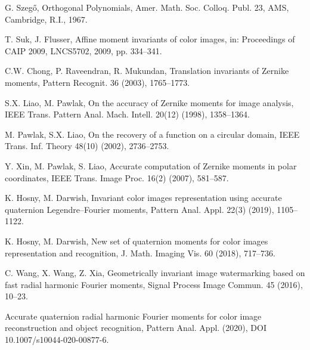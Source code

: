 \documentclass[12pt]{article}
\begin{document}
\begin{thebibliography}{99}
G. Szeg\H o, Orthogonal Polynomials, Amer. Math. Soc. Colloq. Publ. 23, AMS, Cambridge, R.I., 1967.

T. Suk, J. Flusser, Affine moment invariants of color images, in: Proceedings of CAIP 2009, LNCS5702, 2009, pp. 334--341.

C.W. Chong, P. Raveendran, R. Mukundan, Translation invariants of Zernike moments, Pattern Recognit. 36 (2003), 1765--1773.

S.X. Liao, M. Pawlak, On the accuracy of Zernike moments for image analysis, IEEE Trans. Pattern Anal. Mach. Intell. 20(12) (1998), 1358--1364.

M. Pawlak, S.X. Liao, On the recovery of a function on a circular domain, IEEE Trans. Inf. Theory 48(10) (2002), 2736–2753.

Y. Xin, M. Pawlak, S. Liao, Accurate computation of Zernike moments in polar coordinates, IEEE Trans. Image Proc. 16(2) (2007), 581--587.

K. Hosny, M. Darwish, 
Invariant color images representation using accurate quaternion Legendre--Fourier moments, 
Pattern Anal. Appl. 22(3) (2019), 1105--1122.

K. Hosny, M. Darwish, 
New set of quaternion moments for color images representation and recognition,
J. Math. Imaging Vis. 60 (2018), 717--736.

C. Wang, X. Wang, Z. Xia, Geometrically invariant image watermarking based on fast radial harmonic Fourier moments, 
Signal Process Image Commun. 45 (2016), 10--23.


Accurate quaternion radial harmonic Fourier moments for color image reconstruction and object recognition,
Pattern Anal. Appl. (2020), DOI 10.1007/s10044-020-00877-6.


\end{thebibliography}
\end{document}
